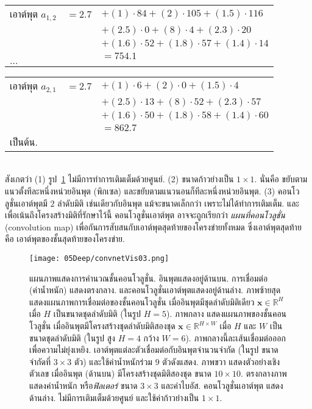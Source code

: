 \begin{tabular}{lll}	
	เอาต์พุต $a_{1,2}$ & $= 2.7$ & $+ (1) \cdot 84 + (2) \cdot 105 + (1.5) \cdot 116$ \\
	&& $+ (2.5) \cdot 0 + (8) \cdot 4 + (2.3) \cdot 20$ \\
	&& $+ (1.6) \cdot 52 + (1.8) \cdot 57 + (1.4) \cdot 14$ \\ 
	&& $= 754.1$ \\
	\multicolumn{3}{l}{$\ldots$}
\end{tabular} 

\begin{tabular}{lll}		
	เอาต์พุต $a_{2,1}$ &  $= 2.7$ & $+ (1) \cdot 6 + (2) \cdot 0 + (1.5) \cdot 4$ \\
	&& $+ (2.5) \cdot 13 + (8) \cdot 52 + (2.3) \cdot 57$ \\
	&& $+ (1.6) \cdot 50 + (1.8) \cdot 58 + (1.4) \cdot 60$ \\
	&& $= 862.7$ \\
	\multicolumn{3}{l}{เป็นต้น.}
\end{tabular} 
\\

สังเกตว่า 
(1) รูป~\ref{fig: deep conv C1 F1} ไม่มีการทำการเติมเต็มด้วยศูนย์.
(2) ขนาดก้าวย่างเป็น $1 \times 1$. 
นั่นคือ ขยับตามแนวตั้งทีละหนึ่งหน่วยอินพุต (พิกเซล) และขยับตามแนวนอนก็ทีละหนึ่งหน่วยอินพุต.
(3) คอนโวลูชั่นเอาต์พุตมี $2$ ลำดับมิติ เช่นเดียวกับอินพุต แม้จะขนาดเล็กกว่า เพราะไม่ได้ทำการเติมเต็ม. 
และ เพื่อเน้นถึงโครงสร้างมิติที่รักษาไว้นี้
คอนโวลูชั่นเอาต์พุต อาจจะถูกเรียกว่า \textit{แผนที่คอนโวลูชั่น} (convolution map) 
เพื่อกันการสับสนกับเอาต์พุตสุดท้ายของโครงข่ายทั้งหมด 
ซึ่งเอาต์พุตสุดท้าย คือ เอาต์พุตของชั้นสุดท้ายของโครงข่าย.

%
\begin{figure}
	\begin{center}
		\texttt{[image: 05Deep/convnetVis03.png]}
	\end{center}
	\caption[การคำนวณชั้นคอนโวลูชั่น]{แผนภาพแสดงการคำนวณชั้นคอนโวลูชั่น. อินพุตแสดงอยู่ด้านบน.
	การเชื่อมต่อ (ค่าน้ำหนัก) แสดงตรงกลาง. 
	และคอนโวลูชั่นเอาต์พุตแสดงอยู่ด้านล่าง.
		ภาพซ้ายสุด แสดงแผนภาพการเชื่อมต่อของชั้นคอนโวลูชั่น เมื่ออินพุตมีชุดลำดับมิติเดียว $\bm{x} \in \mathbb{R}^H$ เมื่อ $H$ เป็นขนาดชุดลำดับมิติ (ในรูป $H = 5$).
		ภาพกลาง แสดงแผนภาพของชั้นคอนโวลูชั่น เมื่ออินพุตมีโครงสร้างชุดลำดับมิติสองชุด $\bm{x} \in \mathbb{R}^{H \times W}$ เมื่อ $H$ และ $W$ เป็นขนาดชุดลำดับมิติ (ในรูป สูง $H = 4$ กว้าง $W = 6$).
		ภาพกลางนี้ละเส้นเชื่อมต่อออก เพื่อความไม่ยุ่งเหยิง.
		เอาต์พุตแต่ละตัวเชื่อมต่อกับอินพุตจำนวนจำกัด (ในรูป ขนาดจำกัดที่ $3 \times 3$ ตัว) และใช้ค่าน้ำหนักร่วม $9$ ตัวดังแสดง.
		ภาพขวา แสดงตัวอย่างเชิงตัวเลข เมื่ออินพุต (ด้านบน) มีโครงสร้างชุดมิติสองชุด ขนาด $10 \times 10$.
		ตรงกลางภาพ แสดงค่าน้ำหนัก หรือ\textit{ฟิลเตอร์} ขนาด $3 \times 3$ และค่าไบอัส.
		คอนโวลูชั่นเอาต์พุต แสดงด้านล่าง.
		ไม่มีการเติมเต็มด้วยศูนย์ และใช้ค่าก้าวย่างเป็น $1 \times 1$.
	}
	\label{fig: deep conv C1 F1}
\end{figure}
%

